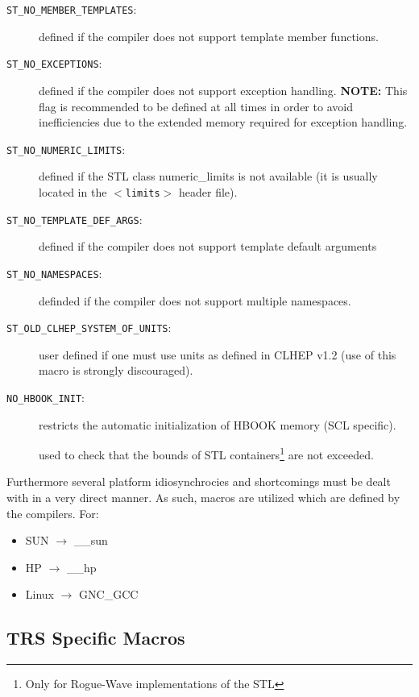 \documentclass[twoside]{article}
\newcommand{\name}[1]{\textsf{#1}}%
\newcommand{\comp}[1]{\texttt{#1}}%
\begin{document}
\begin{description}
\item[\comp{ST\_NO\_MEMBER\_TEMPLATES}:] defined if the compiler does not support template
    member functions. 
\item[\comp{ST\_NO\_EXCEPTIONS}:] defined  if the compiler does not support exception
    handling. {\bf NOTE:} This flag is recommended to be defined at all times in order to
avoid inefficiencies due to the extended memory required for exception 
handling. 
\item[\comp{ST\_NO\_NUMERIC\_LIMITS}:] defined if the STL class \name{numeric\_limits}
    is not available (it is usually located in the $<$\comp{limits}$>$ header file).
\item[\comp{ST\_NO\_TEMPLATE\_DEF\_ARGS}:] defined if the compiler does not support
    template default arguments
\item[\comp{ST\_NO\_NAMESPACES}:] definded if the compiler does not support
  multiple namespaces.
\item[\comp{ST\_OLD\_CLHEP\_SYSTEM\_OF\_UNITS}:] user defined if one must use units as
  defined in CLHEP v1.2 (use of this macro is strongly discouraged).
\item[\comp{NO\_HBOOK\_INIT}:] restricts the automatic initialization of HBOOK
  memory (SCL specific).
\item[\comp{RWSTD\_BOUNDS\_CHECKING:] used to check that the bounds of 
STL  containers\footnote{Only for Rogue-Wave  
        implementations of the STL}
are not exceeded.
\end{description}

Furthermore several platform idiosynchrocies and shortcomings must
be dealt with in a very direct manner.  As such, macros are utilized
which are defined by the compilers. For:
\begin{itemize}
  \item SUN $\rightarrow$ \_\_sun
  \item HP  $\rightarrow$ \_\_hp
  \item Linux $\rightarrow$ GNC\_GCC
\end{itemize}

\subsection{\name{TRS} Specific Macros}
\end{document}
